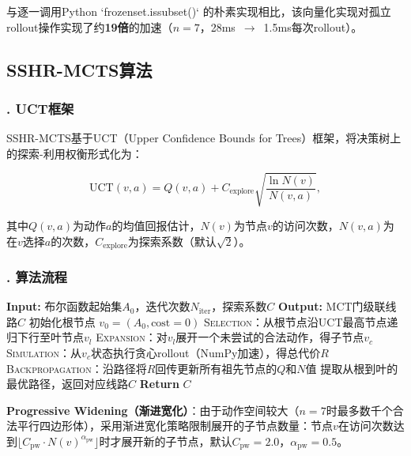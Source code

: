\documentclass[10.5pt,compsoc,UTF8]{CjC}
\theoremstyle{mystyle}
\begin{document}
与逐一调用Python `frozenset.issubset()` 的朴素实现相比，该向量化实现对孤立rollout操作实现了约\textbf{19倍}的加速（$n=7$，28ms~$\to$~1.5ms每次rollout）。

\subsection{\heiti SSHR-MCTS算法}

\subsubsection*{. UCT框架}

SSHR-MCTS基于UCT（Upper Confidence Bounds for Trees）\cite{kocsis2006bandit}框架，将决策树上的探索-利用权衡形式化为：

\begin{equation}
    \text{UCT}(v, a) = Q(v,a) + C_{\text{explore}}\sqrt{\frac{\ln N(v)}{N(v,a)}},
\end{equation}

其中$Q(v,a)$为动作$a$的均值回报估计，$N(v)$为节点$v$的访问次数，$N(v,a)$为在$v$选择$a$的次数，$C_{\text{explore}}$为探索系数（默认$\sqrt{2}$）。

\subsubsection*{. 算法流程}

\begin{algorithm}[H]
\caption{SSHR-MCTS}
\begin{algorithmic}[1]
\State \textbf{Input:} 布尔函数起始集$A_0$，迭代次数$N_{\text{iter}}$，探索系数$C$
\State \textbf{Output:} MCT门级联线路$C$
\State 初始化根节点 $v_0 = (A_0, \text{cost}=0)$
    \State \textsc{Selection}：从根节点沿UCT最高节点递归下行至叶节点$v_l$
    \State \textsc{Expansion}：对$v_l$展开一个未尝试的合法动作，得子节点$v_c$
    \State \textsc{Simulation}：从$v_c$状态执行贪心rollout（NumPy加速），得总代价$R$
    \State \textsc{Backpropagation}：沿路径将$R$回传更新所有祖先节点的$Q$和$N$值
\EndFor
\State 提取从根到叶的最优路径，返回对应线路$C$
\State \textbf{Return} $C$
\end{algorithmic}
\end{algorithm}

\textbf{Progressive Widening（渐进宽化）}：由于动作空间较大（$n=7$时最多数千个合法平行四边形体），采用渐进宽化策略\cite{browne2012survey}限制展开的子节点数量：节点$v$在访问次数达到$\lfloor C_{\text{pw}}\cdot N(v)^{\alpha_{\text{pw}}}\rfloor$时才展开新的子节点，默认$C_{\text{pw}}=2.0$，$\alpha_{\text{pw}}=0.5$。
\end{document}
